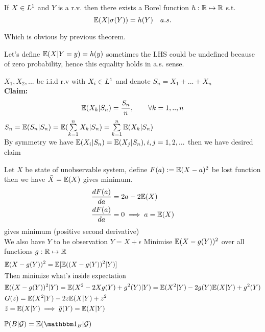 \begin{thm}
If $X\in L^{1}$ and $Y$ is a r.v. then there exists a Borel function $h:\mathbb{R}\mapsto\mathbb{R}$ s.t. 
\begin{equation*}
    \mathbb{E}(X|\sigma(Y)) = h(Y) \quad a.s.
\end{equation*}
\end{thm}Which is obvious by previous theorem.
\begin{rem}
Let's define $\mathbb{E}(X|Y=y) = h(y)$ sometimes the LHS could be undefined because of zero probability, hence this equality holds in a.s. sense.
\end{rem}
\newpage
\begin{example}
$X_1, X_2, ...$ be i.i.d r.v with $X_i\in L^{1}$ and denote $S_n = X_1 + ... + X_n$ \\
\textbf{Claim:}
\begin{equation*}
    \mathbb{E}(X_k|S_n) = \frac{S_n}{n}, \qquad \forall k = 1,..,n
\end{equation*}
\pf $S_n = \mathbb{E}(S_n|S_n)= \mathbb{E}(\sum\limits_{k=1}^n X_k|S_n) =\sum\limits_{k=1}^n \mathbb{E}( X_k|S_n)$ \\
By symmetry we have $\mathbb{E}(X_i|S_n) = \mathbb{E}(X_j|S_n), i,j = 1,2,...$ then we have desired claim
\end{example}
\vspace{2cm}
\begin{example}
Let $X$ be state of unobservable system, define $F(a):=\mathbb{E}(X-a)^2$ be lost function then we have $\bar{X} = \mathbb{E}(X)$ gives minimum. 
\begin{align*}
    &\frac{\mathop{}\!d F(a)}{\mathop{}\!d a} = 2a - 2\mathbb{E}(X) \\
    &\frac{\mathop{}\!d F(a)}{\mathop{}\!d a} = 0 \implies a = \mathbb{E}(X)
\end{align*}gives minimum (positive second derivative) \\
We also have $Y$ to be observation $Y = X+\epsilon$ Minimise $\mathbb{E}(X - g(Y))^2$ over all functions $g: \mathbb{R} \mapsto \mathbb{R}$
\begin{align*}
    &\mathbb{E}(X - g(Y))^2 = \mathbb{E}[\mathbb{E}((X - g(Y))^2 |Y)] \\
    \intertext{Then minimize what's inside expectation}
    &\mathbb{E}((X - g(Y))^2 |Y) = \mathbb{E}(X^2 -2Xg(Y) +g^2(Y) |Y) = \mathbb{E}(X^2|Y)-2g(Y)\mathbb{E}(X|Y) + g^2(Y) \\
    & G(z)= \mathbb{E}(X^2|Y)-2z\mathbb{E}(X|Y) + z^2 \\
    &\bar{z} = \mathbb{E}(X|Y) \implies \bar{g}(Y) = \mathbb{E}(X|Y)
\end{align*}
\end{example}
\newpage
\begin{dfn}
$\prob(B|\setg) = \E(\I_B|\setg)$
\end{dfn}
